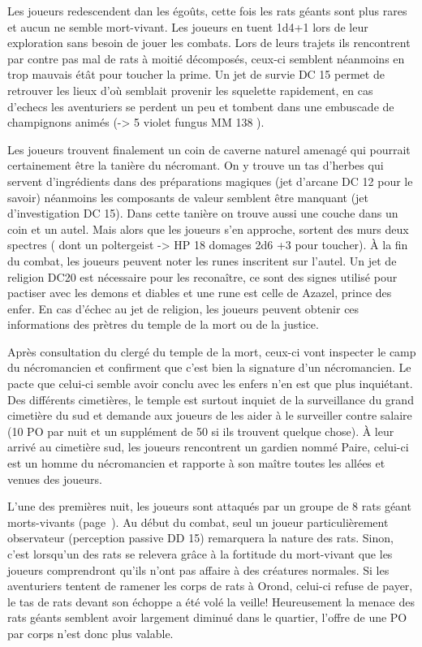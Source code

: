 Les joueurs redescendent dan les égoûts, cette fois les rats géants sont plus rares et aucun ne semble 
mort-vivant. Les joueurs en tuent 1d4+1 lors de leur exploration sans besoin de jouer les combats. Lors de
leurs trajets ils rencontrent par contre pas mal de rats à moitié décomposés, ceux-ci semblent néanmoins
en trop mauvais étât pour toucher la prime. Un jet de survie DC 15 permet de retrouver les lieux d'où 
semblait provenir les squelette rapidement, en cas d'echecs les aventuriers se perdent un peu et tombent 
dans une embuscade de champignons animés (-> 5 violet fungus MM 138 \pageref{FungusViolet}).

Les joueurs trouvent finalement un coin de caverne naturel amenagé qui pourrait certainement être la tanière
du nécromant. On y trouve un tas d'herbes qui servent d'ingrédients dans des préparations magiques (jet 
d'arcane DC 12 pour le savoir) néanmoins les composants de valeur semblent être manquant (jet d'investigation
DC 15). Dans cette tanière on trouve aussi une couche dans un coin et un autel. Mais alors que les joueurs
s'en approche, sortent des murs deux spectres (\pageref{Spectre} dont un poltergeist -> HP 18 
domages 2d6 +3 pour toucher). À la fin du combat, les joueurs peuvent noter les runes inscritent sur l'autel.
Un jet de religion DC20 est nécessaire pour les reconaître, ce sont des signes utilisé pour pactiser avec
les demons et diables et une rune est celle de Azazel, prince des enfer. En cas d'échec au jet de religion, 
les joueurs peuvent obtenir ces informations des prètres du temple de la mort ou de la justice.

Après consultation du clergé du temple de la mort, ceux-ci vont inspecter le camp du nécromancien et 
confirment que c'est bien la signature d'un nécromancien. Le pacte que celui-ci semble avoir conclu avec les 
enfers n'en est que plus inquiétant. Des différents cimetières, le temple est surtout inquiet de la 
surveillance du grand cimetière du sud et demande aux joueurs de les aider à le surveiller contre salaire 
(10 PO par nuit et un supplément de 50 si ils trouvent quelque chose). À leur arrivé au cimetière sud,
les joueurs rencontrent un gardien nommé Paire, celui-ci est un homme du nécromancien et rapporte à son 
maître toutes les allées et venues des joueurs.


L'une des premières nuit, les joueurs sont attaqués par un groupe de 8 rats géant morts-vivants 
(page~\pageref{}). Au début du combat, seul un 
joueur particulièrement observateur (perception passive DD 15) remarquera la nature des rats. Sinon, c'est 
lorsqu'un des rats se relevera grâce à la fortitude du mort-vivant que les joueurs comprendront qu'ils
n'ont pas affaire à des créatures normales. Si les aventuriers tentent de ramener les corps de rats à Orond,
celui-ci refuse de payer, le tas de rats devant son échoppe a été volé la veille! Heureusement la menace
des rats géants semblent avoir largement diminué dans le quartier, l'offre de une PO par corps n'est donc
plus valable.

